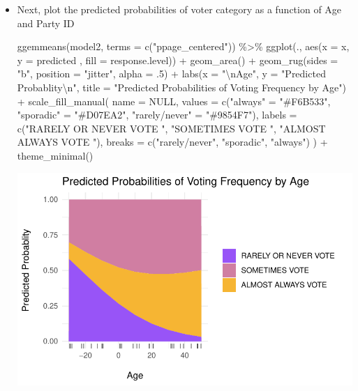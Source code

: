 \documentclass[
  letterpaper,
  DIV=11,
  numbers=noendperiod]{scrartcl}
\newenvironment{Shaded}{\begin{snugshade}}{\end{snugshade}}
\newcommand{\AttributeTok}[1]{\textcolor[rgb]{0.40,0.45,0.13}{#1}}
\newcommand{\ConstantTok}[1]{\textcolor[rgb]{0.56,0.35,0.01}{#1}}
\newcommand{\DecValTok}[1]{\textcolor[rgb]{0.68,0.00,0.00}{#1}}
\newcommand{\FunctionTok}[1]{\textcolor[rgb]{0.28,0.35,0.67}{#1}}
\newcommand{\NormalTok}[1]{\textcolor[rgb]{0.00,0.23,0.31}{#1}}
\newcommand{\OtherTok}[1]{\textcolor[rgb]{0.00,0.23,0.31}{#1}}
\newcommand{\SpecialCharTok}[1]{\textcolor[rgb]{0.37,0.37,0.37}{#1}}
\newcommand{\StringTok}[1]{\textcolor[rgb]{0.13,0.47,0.30}{#1}}
\begin{document}
\begin{itemize}
\item
  Next, plot the predicted probabilities of voter category as a function
  of Age and Party ID

\begin{Shaded}
\begin{Highlighting}[]
  \FunctionTok{ggemmeans}\NormalTok{(model2, }\AttributeTok{terms =} \FunctionTok{c}\NormalTok{(}\StringTok{"ppage\_centered"}\NormalTok{)) }\SpecialCharTok{\%\textgreater{}\%} 
  \FunctionTok{ggplot}\NormalTok{(., }\FunctionTok{aes}\NormalTok{(}\AttributeTok{x =}\NormalTok{ x, }\AttributeTok{y =}\NormalTok{ predicted , }\AttributeTok{fill =}\NormalTok{ response.level)) }\SpecialCharTok{+}
  \FunctionTok{geom\_area}\NormalTok{() }\SpecialCharTok{+} 
  \FunctionTok{geom\_rug}\NormalTok{(}\AttributeTok{sides =} \StringTok{"b"}\NormalTok{, }\AttributeTok{position =} \StringTok{"jitter"}\NormalTok{, }\AttributeTok{alpha =}\NormalTok{ .}\DecValTok{5}\NormalTok{) }\SpecialCharTok{+} 
  \FunctionTok{labs}\NormalTok{(}\AttributeTok{x =} \StringTok{"}\SpecialCharTok{\textbackslash{}n}\StringTok{Age"}\NormalTok{, }\AttributeTok{y =} \StringTok{"Predicted Probablity}\SpecialCharTok{\textbackslash{}n}\StringTok{"}\NormalTok{, }\AttributeTok{title =} \StringTok{"Predicted Probabilities of Voting Frequency by Age"}\NormalTok{) }\SpecialCharTok{+}
  \FunctionTok{scale\_fill\_manual}\NormalTok{(}
    \AttributeTok{name =} \ConstantTok{NULL}\NormalTok{,}
    \AttributeTok{values =} \FunctionTok{c}\NormalTok{(}\StringTok{"always"} \OtherTok{=} \StringTok{"\#F6B533"}\NormalTok{, }\StringTok{"sporadic"} \OtherTok{=} \StringTok{"\#D07EA2"}\NormalTok{, }\StringTok{"rarely/never"} \OtherTok{=} \StringTok{"\#9854F7"}\NormalTok{),}
    \AttributeTok{labels =} \FunctionTok{c}\NormalTok{(}\StringTok{"RARELY OR NEVER VOTE    "}\NormalTok{, }\StringTok{"SOMETIMES VOTE    "}\NormalTok{, }\StringTok{"ALMOST ALWAYS VOTE    "}\NormalTok{),}
    \AttributeTok{breaks =} \FunctionTok{c}\NormalTok{(}\StringTok{"rarely/never"}\NormalTok{, }\StringTok{"sporadic"}\NormalTok{, }\StringTok{"always"}\NormalTok{)}
\NormalTok{  ) }\SpecialCharTok{+}
  \FunctionTok{theme\_minimal}\NormalTok{()}
\end{Highlighting}
\end{Shaded}

  \includegraphics{Lab4_multinom_Questions-1_files/figure-pdf/unnamed-chunk-14-1.pdf}
\end{itemize}
\end{document}
